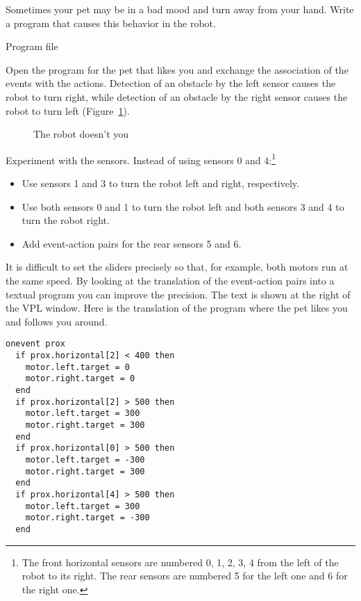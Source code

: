 Sometimes your pet may be in a bad mood and turn away from your hand.
Write a program that causes this behavior in the robot.

{\raggedleft \hfill Program file }

Open the program for the pet that likes you and exchange the association
of the events with the actions. Detection of an obstacle by the left
sensor causes the robot to turn right, while detection of an obstacle by
the right sensor causes the robot to turn left (Figure~\ref{fig.hates}).

\begin{figure}[htb]
\begin{center}
\caption{The robot doesn't you}\label{fig.hates}
\end{center}
\end{figure}


Experiment with the sensors. Instead of using sensors 0 and
4:\footnote{The front horizontal sensors are numbered 0, 1, 2, 3, 4 from
the left of the robot to its right. The rear sensors are numbered 5 for
the left one and 6 for the right one.}

\begin{itemize}
\item Use sensors 1 and 3 to turn the robot left and right,
respectively.
\item Use both sensors 0 and 1 to turn the robot left and both sensors 3
and 4 to turn the robot right.
\item Add event-action pairs for the rear sensors 5 and 6.
\end{itemize}


It is difficult to set the sliders precisely so that, for example, both
motors run at the same speed. By looking at the translation of the
event-action pairs into a textual program you can improve the precision.
The text is shown at the right of the VPL window.
Here is the translation of the program where the
pet likes you and follows you around.

\begin{small}
\begin{verbatim}
onevent prox
  if prox.horizontal[2] < 400 then
    motor.left.target = 0
    motor.right.target = 0
  end
  if prox.horizontal[2] > 500 then
    motor.left.target = 300
    motor.right.target = 300
  end
  if prox.horizontal[0] > 500 then
    motor.left.target = -300
    motor.right.target = 300
  end
  if prox.horizontal[4] > 500 then
    motor.left.target = 300
    motor.right.target = -300
  end
\end{verbatim}
\end{small}

